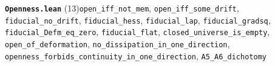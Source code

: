 \documentclass[11pt,a4paper]{article}
\theoremstyle{sudef}
\begin{document}
\noindent\textbf{\texttt{Openness.lean}} (13)\quad \texttt{open\_\allowbreak iff\_\allowbreak not\_\allowbreak mem}, \texttt{open\_\allowbreak iff\_\allowbreak some\_\allowbreak drift}, \texttt{fiducial\_\allowbreak no\_\allowbreak drift}, \texttt{fiducial\_\allowbreak hess}, \texttt{fiducial\_\allowbreak lap}, \texttt{fiducial\_\allowbreak gradsq}, \texttt{fiducial\_\allowbreak Defm\_\allowbreak eq\_\allowbreak zero}, \texttt{fiducial\_\allowbreak flat}, \texttt{closed\_\allowbreak universe\_\allowbreak is\_\allowbreak empty}, \texttt{open\_\allowbreak of\_\allowbreak deformation}, \texttt{no\_\allowbreak dissipation\_\allowbreak in\_\allowbreak one\_\allowbreak direction}, \texttt{openness\_\allowbreak forbids\_\allowbreak continuity\_\allowbreak in\_\allowbreak one\_\allowbreak direction}, \texttt{A5\_\allowbreak A6\_\allowbreak dichotomy}\par\smallskip
\end{document}

